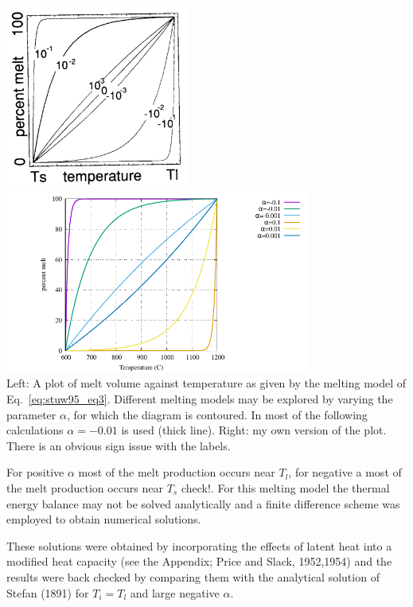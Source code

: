 \begin{center}
\includegraphics[width=6cm]{python_codes/fieldstone_169/images/stuw95a}
\includegraphics[width=10cm]{python_codes/fieldstone_169/images/percent_melt}\\
Left: A plot of melt volume against temperature as given by
the melting model of Eq.~\eqref{eq:stuw95_eq3}. Different melting models may
be explored by varying the parameter $\alpha$, for which the diagram 
is contoured. In most of the following calculations
$\alpha= - 0.01$ is used (thick line).
Right: my own version of the plot. {\color{red} There is an obvious sign issue with the labels}.
\end{center}



For positive $\alpha$ most of the melt production occurs near $T_l$, for negative a most of the
melt production occurs near $T_s$ {\color{red} check!}. For this melting
model the thermal energy balance may not be
solved analytically and a finite difference scheme
was employed to obtain numerical solutions.

These solutions were obtained by incorporating the effects of latent heat into a modified heat
capacity (see the Appendix; Price and Slack, 1952,1954) and the results were back checked by
comparing them with the analytical solution of
Stefan (1891) for $T_i = T_l$ and large negative $\alpha$.







